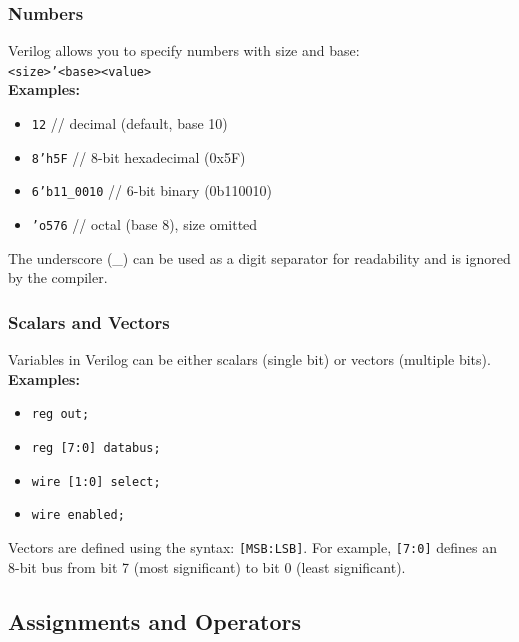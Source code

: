 \documentclass{beamer}
\begin{document}
\begin{frame}\frametitle{Numbers}
Verilog allows you to specify numbers with size and base: \\
\texttt{<size>'<base><value>} \\
\vspace{0.5cm}
\textbf{Examples:}
\begin{itemize}
	\item \texttt{12} \hspace{1cm} // decimal (default, base 10)
	\item \texttt{8'h5F} \hspace{0.5cm} // 8-bit hexadecimal (0x5F)
	\item \texttt{6'b11\_0010} \hspace{0.2cm} // 6-bit binary (0b110010)
	\item \texttt{'o576} \hspace{0.7cm} // octal (base 8), size omitted
\end{itemize}
\vspace{0.3cm}
The underscore (\_) can be used as a digit separator for readability and is ignored by the compiler.
\end{frame}

\begin{frame}\frametitle{Scalars and Vectors}
Variables in Verilog can be either scalars (single bit) or vectors (multiple bits). \\
\vspace{0.3cm}
\textbf{Examples:}
\begin{itemize}
	\item \texttt{reg out;} \hspace{1cm} %
	\item \texttt{reg [7:0] databus;} \hspace{0.5cm} %
	\item \texttt{wire [1:0] select;} \hspace{0.7cm} %
	\item \texttt{wire enabled;} \hspace{1.2cm} %
\end{itemize}
\vspace{0.3cm}
Vectors are defined using the syntax: \texttt{[MSB:LSB]}. For example, \texttt{[7:0]} defines an 8-bit bus from bit 7 (most significant) to bit 0 (least significant).
\end{frame}

\subsection{Assignments and Operators}
\end{document}
